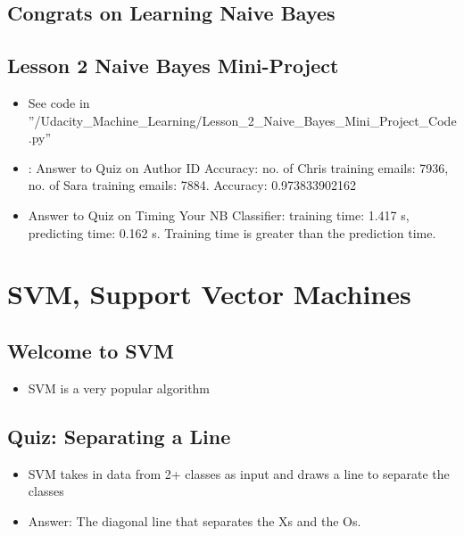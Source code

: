 \documentclass[12pt]{report}
\begin{document}
\subsection{Congrats on Learning Naive Bayes}

\subsection{Lesson 2 Naive Bayes Mini-Project}

\begin{itemize}

\item See code in ''/Udacity\_Machine\_Learning/Lesson\_2\_Naive\_Bayes\_Mini\_Project\_Code.py''

\item: Answer to Quiz on Author ID Accuracy: no. of Chris training emails: 7936, no. of Sara training emails: 7884. Accuracy: 0.973833902162

\item Answer to Quiz on Timing Your NB Classifier: training time: 1.417 s, predicting time: 0.162 s. Training time is greater than the prediction time. 

\end{itemize}



\section{SVM, Support Vector Machines}

\subsection{Welcome to SVM}

\begin{itemize}

\item SVM is a very popular algorithm

\end{itemize}

\subsection{Quiz: Separating a Line}

\begin{itemize} 

\item SVM takes in data from 2+ classes as input and draws a line to separate the classes

\item Answer: The diagonal line that separates the Xs and the Os.

\end{itemize}
\end{document}
